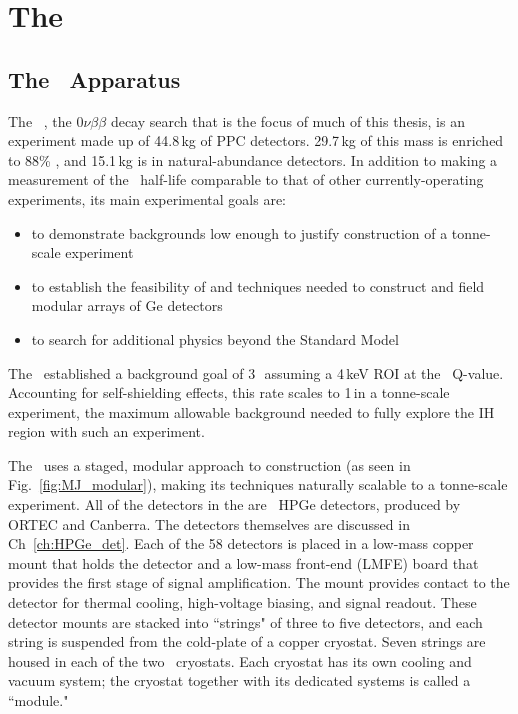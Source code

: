 \section{The \MJ\ \DEM}\label{sec:MJD}
\subsection{The \DEM\ Apparatus}
The \MJ~\MJDemo, the $0\nu\beta\beta$ decay search that is the focus of much of this thesis, is an experiment made up of 44.8\,kg of PPC detectors. 29.7\,kg of this mass is enriched to 88\% , and 15.1\,kg is in natural-abundance detectors. In addition to making a measurement of the \nonubb\ half-life comparable to that of other currently-operating experiments, its main experimental goals are:
\begin{itemize}
\item to demonstrate backgrounds low enough to justify construction of a tonne-scale experiment
\item to establish the feasibility of and techniques needed to construct and field modular arrays of Ge detectors
\item to search for additional physics beyond the Standard Model
\end{itemize}
The \DEM\ established a background goal of 3\,\cpRty\, assuming a 4\,keV ROI at the \nonubb\ Q-value. Accounting for self-shielding effects, this rate scales to 1\,\cpRty in a tonne-scale experiment, the maximum allowable background needed to fully explore the IH region with such an experiment. 

The \MJDemo~uses a staged, modular approach to construction (as seen in Fig.~\ref{fig:MJ_modular}), making its techniques naturally scalable to a tonne-scale experiment. All of the detectors in the \DEM are \ppc\ HPGe detectors, produced by ORTEC and Canberra. The detectors themselves are discussed in Ch~\ref{ch:HPGe_det}. Each of the 58 detectors is placed in a low-mass copper mount that holds the detector and a low-mass front-end (LMFE) board that provides the first stage of signal amplification. The mount provides contact to the detector for thermal cooling, high-voltage biasing, and signal readout. These detector mounts are stacked into ``strings" of three to five detectors, and each string is suspended from the cold-plate of a copper cryostat. Seven strings are housed in each of the two \MJ\ cryostats. Each cryostat has its own cooling and vacuum system; the cryostat together with its dedicated systems is called a ``module." 


